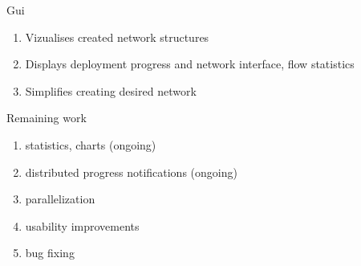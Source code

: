 \documentclass{beamer}
\begin{document}
	\begin{frame}{Gui}

		\begin{enumerate}
			\item Vizualises created network structures
			\item Displays deployment progress and network interface, flow statistics
			\item Simplifies creating desired network
		\end{enumerate}
	
	\end{frame}

	\begin{frame}{Remaining work}

		\begin{enumerate}
			\item statistics, charts (ongoing)
			\item distributed progress notifications (ongoing)
			\item parallelization
			\item usability improvements
			\item bug fixing
		\end{enumerate}
	
	\end{frame}
\end{document}
